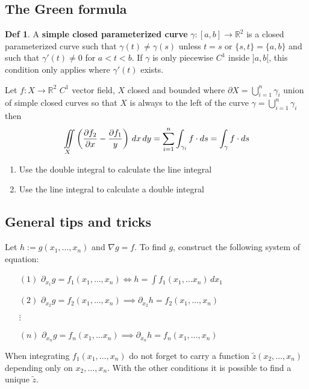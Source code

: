 \documentclass[a4paper, 10pt]{article}
\theoremstyle{definition}
\newtheorem*{definition}{Def}
\newcommand{\R}{\mathbb{R}}
\begin{document}
\pagebreak
\subsection{The Green formula}

\begin{definition}
    A \textbf{simple closed parameterized curve} \(\gamma:[a, b] \to \R^2\) is a closed parameterized curve such that \(\gamma(t) \neq \gamma(s)\) unless \(t = s\) or \(\{s, t\} = \{a, b\}\) and such that \(\gamma'(t) \neq 0\) for \(a < t < b\). If \(\gamma\) is only piecewise \(C^1\) inside \(]a, b[\), this condition only applies where \(\gamma'(t)\) exists.
\end{definition}

\begin{ntheorem*}
    Let \(f: X \to \R^2\) \(C^1\) vector field, \(X\) closed and bounded where \(\partial X = \bigcup_{i = 1}^n \gamma_i\) union of simple closed curves so that \(X\)  is always to the left of the curve \(\gamma = \bigcup_{i = 1}^n \gamma_i\) then
    \[\iint\displaylimits_{X} \left(\frac{\partial f_2}{\partial x} - \frac{\partial f_1}{y}\right) \, dx \, dy = \sum_{i =1}^n \int_{\gamma_i} f \cdot ds = \int_\gamma f \cdot ds\]
\end{ntheorem*}

\begin{note*}
    \begin{enumerate}
        \item Use the double integral to calculate the line integral
        \item Use the line integral to calculate a double integral
    \end{enumerate}
\end{note*}

\subsection*{General tips and tricks}
\begin{note*}
    Let \(h:=g(x_1, \dots, x_n)\) and \(\nabla g = f\). 
    To find \(g\), construct the following system of equation:
    \begin{itemize}
        \item[\((1)\)] \(\partial_{x_1} g = f_1(x_1, \ldots, x_n) \iff h = \int f_1(x_1, \ldots x_n) \,dx_1\)
        \item[\((2)\)] \(\partial_{x_2} g = f_2(x_1, \ldots, x_n) \implies \partial_{x_2} h = f_2(x_1, \ldots, x_n)\)
        \item[\(\vdots\)]
        \item[\((n)\)]  \(\partial_{x_n} g = f_n(x_1, \ldots x_n) \implies \partial_{x_n} h = f_n(x_1, \ldots, x_n)\)
    \end{itemize}
    When integrating \(f_1(x_1, \dots, x_n)\) do not forget to carry a function \(\tilde{z}(x_2, \ldots, x_n)\) depending only on \(x_2, \ldots, x_n\). With the other conditions it is possible to find a unique \(\tilde{z}\).
\end{note*}
\end{document}
